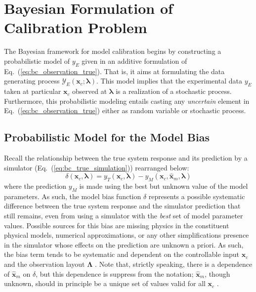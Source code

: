 \section{Bayesian Formulation of Calibration Problem}\label{sec:bc_modular}

The Bayesian framework for model calibration begins by constructing a probabilistic model of $y_E$ given in an additive formulation of Eq.~(\ref{eq:bc_observation_true}). 
That is, it aims at formulating the data generating process $\mathcal{Y}_E(\bm{x}_c; \bm{\lambda})$.
This model implies that the experimental data $y_E$ taken at particular $\bm{x}_c$ observed at $\bm{\lambda}$ is a realization of a stochastic process.
Furthermore, this probabilistic modeling entails casting any \emph{uncertain} element in Eq.~(\ref{eq:bc_observation_true}) either as random variable or stochastic process.

\subsection{Probabilistic Model for the Model Bias}\label{sub:bc_modular_bias}

Recall the relationship between the true system response and its prediction by a simulator (Eq.~(\ref{eq:bc_true_simulation})) rearranged below:
\begin{equation*}
    \delta (\bm{x}_c, \boldsymbol{\lambda}) = y_T(\bm{x}_c, \boldsymbol{\lambda}) - y_M (\bm{x}_c, \hat{\bm{x}}_m, \boldsymbol{\lambda})
\end{equation*}
where the prediction $y_M$ is made using the best but unknown value of the model parameters.
As such, the model bias function $\delta$ represents a possible systematic difference between the true system response and the simulator prediction that still remains, even from using a simulator with the \emph{best} set of model parameter values.
Possible sources for this bias are missing physics in the constituent physical models, numerical approximations, or any other simplifications presence in the simulator whose effects on the prediction are unknown a priori.
As such, the bias term tends to be systematic and dependent on the controllable input $\bm{x}_c$ and the observation layout $\boldsymbol{\Lambda}$ \cite{Reichert2012}.
Note that, strictly speaking, there is a dependence of $\hat{\bm{x}}_m$ on $\delta$, but this dependence is suppress from the notation; $\hat{\bm{x}}_m$, though unknown, should in principle be a unique set of values valid for all $\bm{x}_c$ \cite{Bayarri2007,Arendt2012}.

